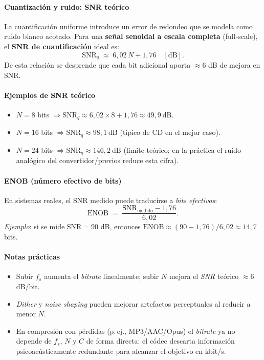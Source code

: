 \documentclass[11pt,a4paper]{article}
\begin{document}
\paragraph{Cuantización y ruido: SNR teórico}
La cuantificación uniforme introduce un error de redondeo que se modela como ruido blanco acotado.
Para una \textbf{señal senoidal a escala completa} (full-scale), el \textbf{SNR de cuantificación} ideal es:
\begin{equation}
  \mathrm{SNR}_q \;\approx\; 6{,}02\,N + 1{,}76 \quad [\text{dB}].
\end{equation}
De esta relación se desprende que cada bit adicional aporta $\approx 6$ dB de mejora en SNR.

\paragraph{Ejemplos de SNR teórico}
\begin{itemize}
  \item $N=8$ bits $\Rightarrow \mathrm{SNR}_q \approx 6{,}02\times 8 + 1{,}76 \approx 49{,}9\ \text{dB}$.
  \item $N=16$ bits $\Rightarrow \mathrm{SNR}_q \approx 98{,}1\ \text{dB}$ (típico de CD en el mejor caso).
  \item $N=24$ bits $\Rightarrow \mathrm{SNR}_q \approx 146{,}2\ \text{dB}$ (límite teórico; en la práctica
        el ruido analógico del convertidor/previos reduce esta cifra).
\end{itemize}

\paragraph{ENOB (número efectivo de bits)}
En sistemas reales, el SNR medido puede traducirse a \emph{bits efectivos}:
\begin{equation}
  \mathrm{ENOB} \;=\; \frac{\mathrm{SNR}_{\text{medido}} - 1{,}76}{6{,}02}.
\end{equation}
\emph{Ejemplo}: si se mide $\mathrm{SNR}=90$ dB, entonces $\mathrm{ENOB}\approx (90-1{,}76)/6{,}02 \approx 14{,}7$ bits.

\paragraph{Notas prácticas}
\begin{itemize}
  \item Subir $f_s$ aumenta el \emph{bitrate} linealmente; subir $N$ mejora el \emph{SNR} teórico $\approx 6$ dB/bit.
  \item \emph{Dither} y \emph{noise shaping} pueden mejorar artefactos perceptuales al reducir a menor $N$.
  \item En compresión con pérdidas (p.\,ej., MP3/AAC/Opus) el \emph{bitrate} ya no depende de $f_s$, $N$ y $C$ de forma directa:
        el códec descarta información psicoacústicamente redundante para alcanzar el objetivo en kbit/s.
\end{itemize}
\end{document}
